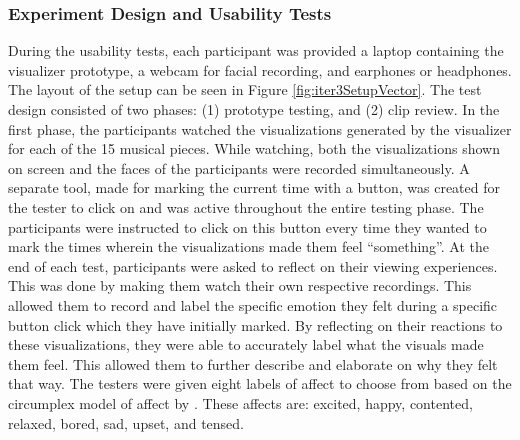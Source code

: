 \documentclass{sigchi-ext}
\begin{document}
\subsubsection{Experiment Design and Usability Tests}
During the usability tests, each participant was provided a laptop containing the visualizer prototype, a webcam for facial recording, and earphones or headphones. The layout of the setup can be seen in Figure \ref{fig:iter3SetupVector}. The test design consisted of two phases: (1) prototype testing, and (2) clip review. In the first phase, the participants watched the visualizations generated by the visualizer for each of the 15 musical pieces. While watching, both the visualizations shown on screen and the faces of the participants were recorded simultaneously. A separate tool, made for marking the current time with a button, was created for the tester to click on and was active throughout the entire testing phase. The participants were instructed to click on this button every time they wanted to mark the times wherein the visualizations made them feel ``something''. At the end of each test, participants were asked to reflect on their viewing experiences. This was done by making them watch their own respective recordings. This allowed them to record and label the specific emotion they felt during a specific button click which they have initially marked. By reflecting on their reactions to these visualizations, they were able to accurately label what the visuals made them feel. This allowed them to further describe and elaborate on why they felt that way. The testers were given eight labels of affect to choose from based on the circumplex model of affect by \cite{Russel:1980}. These affects are: excited, happy, contented, relaxed, bored, sad, upset, and tensed.



\end{document}
